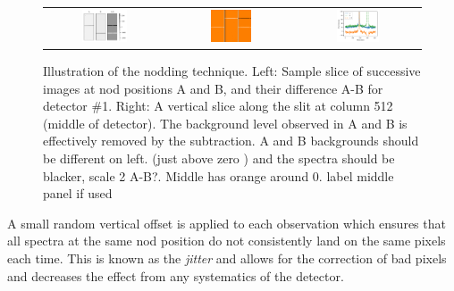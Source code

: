 \begin{figure}
    \centering
    \begin{tabular}{ccc}
        \includegraphics[width=0.4\textwidth]{figures/reduction/nod_image_sample.pdf} &  \includegraphics[width=0.35\textwidth]{figures/reduction/Nods_AB_A-B.png} &
        \includegraphics[width=0.37\textwidth]{figures/reduction/nod_slice_example.pdf}\\
    \end{tabular}
    \caption{Illustration of the nodding technique. Left: Sample slice of successive images at nod positions A and B, and their difference A-B for detector \#1. Right: A vertical slice along the slit at column 512 (middle of detector). The background level observed in A and B is effectively removed by the subtraction. {\red A and B backgrounds should be different on left. (just above zero ) and the spectra should be blacker, scale 2 A-B?}. Middle has orange around 0. {\red label middle panel if used}}
    \label{fig:nodimages}
\end{figure}

A small random vertical offset is applied to each observation which ensures that all spectra at the same nod position do not consistently land on the same pixels each time. This is known as the \emph{jitter} and allows for the correction of bad pixels and decreases the effect from any systematics of the detector.

